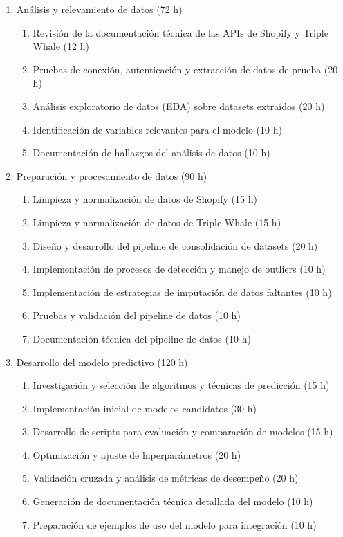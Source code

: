 \documentclass[
11pt, %
]{charter}
\begin{document}
\begin{enumerate}
\item Análisis y relevamiento de datos (72 h)
\begin{enumerate}
\item Revisión de la documentación técnica de las APIs de Shopify y Triple Whale (12 h)
\item Pruebas de conexión, autenticación y extracción de datos de prueba (20 h)
\item Análisis exploratorio de datos (EDA) sobre datasets extraídos (20 h)
\item Identificación de variables relevantes para el modelo (10 h)
\item Documentación de hallazgos del análisis de datos (10 h)
\end{enumerate}
\item Preparación y procesamiento de datos (90 h)
\begin{enumerate}
\item Limpieza y normalización de datos de Shopify (15 h)
\item Limpieza y normalización de datos de Triple Whale (15 h)
\item Diseño y desarrollo del pipeline de consolidación de datasets (20 h)
\item Implementación de procesos de detección y manejo de outliers (10 h)
\item Implementación de estrategias de imputación de datos faltantes (10 h)
\item Pruebas y validación del pipeline de datos (10 h)
\item Documentación técnica del pipeline de datos (10 h)
\end{enumerate}
\item Desarrollo del modelo predictivo (120 h)
\begin{enumerate}
\item Investigación y selección de algoritmos y técnicas de predicción (15 h)
\item Implementación inicial de modelos candidatos (30 h)
\item Desarrollo de scripts para evaluación y comparación de modelos (15 h)
\item Optimización y ajuste de hiperparámetros (20 h)
\item Validación cruzada y análisis de métricas de desempeño (20 h)
\item Generación de documentación técnica detallada del modelo (10 h)
\item Preparación de ejemplos de uso del modelo para integración (10 h)

\end{enumerate}
\end{enumerate}
\end{document}
